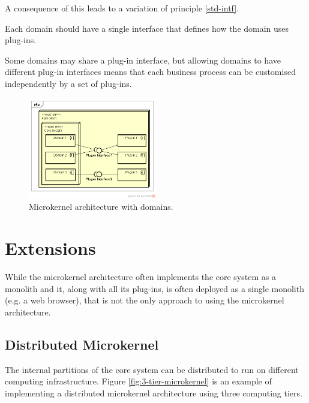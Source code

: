 A consequence of this leads to a variation of principle \ref{std-intf}.

\vspace{1mm}
\begin{definition}\label{domain-intf}
    Each domain should have a single interface that defines how the domain uses plug-ins.
\end{definition}

Some domains may share a plug-in interface, but allowing domains to have different plug-in interfaces
means that each business process can be customised independently by a set of plug-ins.

\begin{figure}[h!]
    \centering
    \includegraphics[trim=38 42 23 42,clip,width=0.5\textwidth]{diagrams/domain-microkernel.png}
    \caption{Microkernel architecture with domains.}
    \label{fig:microkernel-domains}
\end{figure}


\section{Extensions}

While the microkernel architecture often implements the core system as a monolith
and it, along with all its plug-ins, is often deployed as a single monolith
(e.g. a web browser), that is not the only approach to using the microkernel architecture.

\subsection{Distributed Microkernel}

The internal partitions of the core system can be distributed to run on different computing infrastructure.
Figure \ref{fig:3-tier-microkernel} is an example of implementing a distributed microkernel architecture using three computing tiers.

